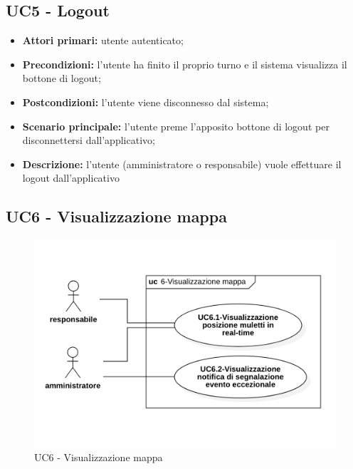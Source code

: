 \subsection{UC5 - Logout}

\begin{itemize}
	\item 	\textbf{Attori primari:} utente autenticato;
	\item 	\textbf{Precondizioni:} l'utente ha finito il proprio turno e il sistema visualizza il bottone di logout;
	\item 	\textbf{Postcondizioni:} l'utente viene disconnesso dal sistema;
	\item 	\textbf{Scenario principale:} l'utente preme l'apposito bottone di logout per disconnettersi dall'applicativo;
	\item 	\textbf{Descrizione:} l'utente (amministratore o responsabile) vuole effettuare il logout dall'applicativo
\end{itemize}


\subsection{UC6 - Visualizzazione mappa}

\begin{figure}[H]
	\centering
	\includegraphics[scale=0.52]{res/images/uc6.png}
	\caption{UC6 - Visualizzazione mappa}
\end{figure}

